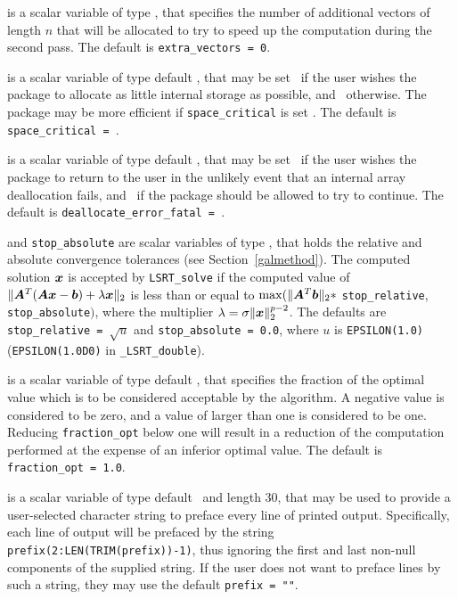 \documentclass{galahad}
\newcommand{\packagename}{LS\-RT}
\newcommand{\fullpackagename}{\libraryname\_\packagename}
\begin{document}
\begin{description}
 is a scalar variable of type \integer,
that specifies the number of additional vectors of length $n$
that will be allocated to try to speed up the computation during the
second pass.
The default is {\tt extra\_vectors = 0}.

 is a scalar variable of type default \logical, that
may be set \true\ if the user wishes the package to allocate as little
internal storage as possible, and \false\ otherwise. The package may
be more efficient if {\tt space\_critical} is set \false.
The default is {\tt space\_critical = \false}.

 is a scalar variable of type default \logical,
that may be set \true\ if the user wishes the package to return to the user
in the unlikely event that an internal array deallocation fails,
and \false\ if the package should be allowed to try to continue.
The default is {\tt deallocate\_error\_fatal = \false}.

 and {\tt stop\_absolute} are scalar variables of type
\realdp, that holds the
relative and absolute convergence tolerances (see Section~\ref{galmethod}).
The computed solution ${\bm{x}}$ is accepted by {\tt \packagename\_solve}
if the computed value of
$\|{\bm{A}}^T ( {\bm{A}} {\bm{x}} - {\bm{b}} ) + \lambda {\bm{x}}\|_2$
is less than or equal
to $\max (\| {\bm{A}}^T {\bm{b}} \|_2 \ast$ {\tt stop\_relative},
{\tt stop\_absolute}$)$, where the multiplier
$\lambda = \sigma \|{\bm{x}}\|_2^{p-2}$.
The defaults are {\tt stop\_relative = $\sqrt{u}$} and
{\tt stop\_absolute = 0.0},
where $u$ is {\tt EPSILON(1.0)} ({\tt EPSILON(1.0D0)} in
{\tt \fullpackagename\_double}).

 is a scalar variable of type default
\realdp, that specifies the fraction
of the optimal value which is to be considered acceptable by the algorithm.
A negative value is considered to be zero, and a value of larger than one
is considered to be one. Reducing {\tt fraction\_opt} below one will result
in a reduction of the computation performed at the expense of an inferior
optimal value.
The default is {\tt fraction\_opt = 1.0}.

 is a scalar variable of type default \character\
and length 30, that may be used to provide a user-selected
character string to preface every line of printed output.
Specifically, each line of output will be prefaced by the string
{\tt prefix(2:LEN(TRIM(prefix))-1)},
thus ignoring the first and last non-null components of the
supplied string. If the user does not want to preface lines by such
a string, they may use the default {\tt prefix = ""}.

\end{description}
\end{document}
